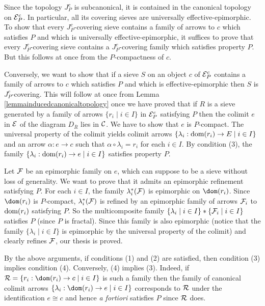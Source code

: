 \documentclass[a4paper,12pt]{article}
\begin{document}
\begin{proofs}
	Since the topology $J^{c}_{P}$ is subcanonical, it is contained in the canonical topology on ${\cal E}^{c}_{P}$. In particular, all its covering sieves are universally effective-epimorphic. To show that every $J^{c}_{P}$-covering sieve contains a family of arrows to $c$ which satisfies $P$ and which is universally effective-epimorphic, it suffices to prove that every $J^{c}_{P}$-covering sieve contains a $J^{c}_{P}$-covering family which satisfies property $P$. But this follows at once from the $P$-compactness of $c$. 
	
	Conversely, we want to show that if a sieve $S$ on an object $c$ of ${\cal E}^{c}_{P}$ contains a family of arrows to $c$ which satisfies $P$ and which is effective-epimorphic then $S$ is $J^{c}_{P}$-covering. This will follow at once from Lemma \ref{lemmainducedcanonicaltopology} once we have proved that if $R$ is a sieve generated by a family of arrows $\{r_{i} \mid i\in I\}$ in ${\cal E}^{c}_{P}$ satisfying $P$ then the colimit $e$ in $\cal E$ of the diagram $D_{\overline{R}}$ lies in $\cal C$. We have to show that $e$ is $P$-compact. The universal property of the colimit yields colimit arrows $\{\lambda_{i}:\textup{dom}(r_i)\to E \mid i\in I\}$ and an arrow $\alpha:e\to c$ such that $\alpha \circ \lambda_{i}=r_{i}$ for each $i\in I$.
	By condition (3), the family $\{\lambda_{i}:\textup{dom}(r_i)\to e \mid i\in I\}$ satisfies property $P$. 
	
	Let ${\cal F}$ be an epimorphic family on $e$, which can suppose to be a sieve without loss of generality. We want to prove that it admits an epimorphic refinement satisfying $P$. For each $i\in I$, the family $\lambda_{i}^{\ast}({\cal F})$ is epimorphic on $\dom(r_i)$. Since $\dom(r_i)$ is $P$-compact, $\lambda_{i}^{\ast}({\cal F})$ is refined by an epimorphic family of arrows ${\cal F}_{i}$ to $\textup{dom}(r_{i})$ satisfying $P$. So the multicomposite family $\{\lambda_i \mid i\in I\} \ast \{{\cal F}_{i} \mid i\in I\}$ satisfies $P$ (since $P$ is fractal). Since this family is also epimorphic (notice that the family $\{\lambda_i \mid i\in I\}$ is epimorphic by the universal property of the colimit) and clearly refines $\cal F$, our thesis is proved.  
	
	By the above arguments, if conditions (1) and (2) are satisfied, then condition (3) implies condition (4). Conversely, (4) implies (3). Indeed, if ${\cal R}=\{r_i:\dom(r_i) \to c \mid i\in I\}$ is such a family then the family of canonical colimit arrows $\{\lambda_i:\dom(r_i) \to e \mid i\in I\}$ corresponds to $\cal R$ under the identification $e\cong c$ and hence \emph{a fortiori} satisfies $P$ since $\cal R$ does. 
	

\end{proofs}
\end{document}
